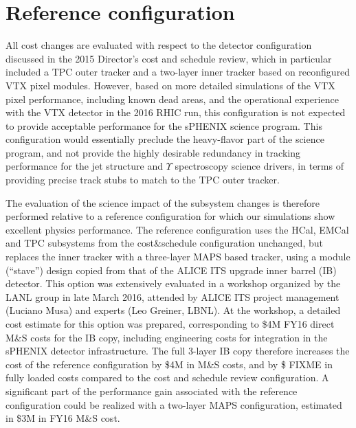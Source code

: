 \section{Reference configuration}

All cost changes are evaluated with respect to the detector configuration discussed in the 2015 Director's cost and schedule review,  
which in particular included a TPC outer tracker and a two-layer inner tracker based on reconfigured VTX pixel modules. However, based on
more detailed simulations of the VTX pixel performance, including known dead areas, and the operational experience with the VTX detector 
in the 2016 RHIC run, this configuration is not expected to provide acceptable performance for the sPHENIX science program. This configuration
would essentially preclude the heavy-flavor part of the science program, and not provide the highly desirable redundancy in tracking performance
for the jet structure and $\Upsilon$ spectroscopy science drivers, in terms of providing precise track stubs to match to the TPC outer tracker. 

The evaluation of the science impact of the subsystem changes is therefore performed relative to a reference configuration for 
which our simulations show excellent physics performance. The reference configuration uses the HCal, EMCal and TPC subsystems 
from the cost\&schedule configuration unchanged, but replaces the inner tracker with a three-layer MAPS based tracker, using a module (``stave'')
design copied from that of the ALICE ITS upgrade inner barrel (IB) detector. This option was extensively evaluated in a workshop
organized by the LANL group in late March 2016, attended by ALICE ITS project management (Luciano Musa) and experts (Leo Greiner, LBNL). 
At the workshop, a detailed cost estimate for this option was prepared, corresponding to \$4M FY16 direct M\&S costs for the IB copy, 
including engineering costs for integration in the sPHENIX detector infrastructure. The full 3-layer IB copy therefore increases
the cost of the reference configuration by \$4M in M\&S costs, and by
\$ FIXME in fully loaded costs compared to the cost and schedule review
configuration. A significant part of the performance gain associated with the reference configuration could be realized with a two-layer MAPS
configuration, estimated in \$3M in FY16 M\&S cost.

